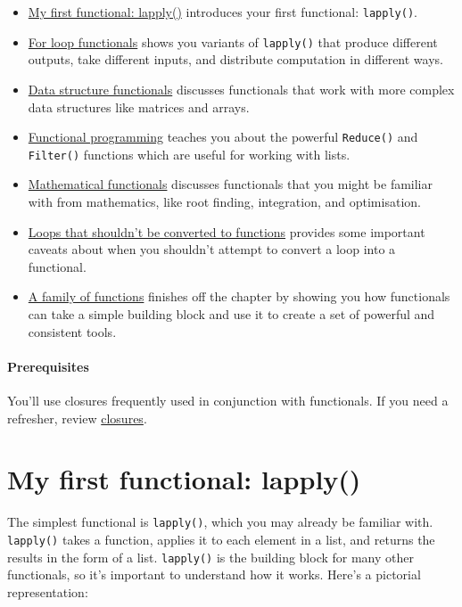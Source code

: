 \begin{itemize}
\item
  \protect\hyperlink{lapply}{My first functional: lapply()} introduces
  your first functional: \texttt{lapply()}.
\item
  \protect\hyperlink{functionals-loop}{For loop functionals} shows you
  variants of \texttt{lapply()} that produce different outputs, take
  different inputs, and distribute computation in different ways.
\item
  \protect\hyperlink{functionals-ds}{Data structure functionals}
  discusses functionals that work with more complex data structures like
  matrices and arrays.
\item
  \protect\hyperlink{functionals-fp}{Functional programming} teaches you
  about the powerful \texttt{Reduce()} and \texttt{Filter()} functions
  which are useful for working with lists.
\item
  \protect\hyperlink{functionals-math}{Mathematical functionals}
  discusses functionals that you might be familiar with from
  mathematics, like root finding, integration, and optimisation.
\item
  \protect\hyperlink{functionals-not}{Loops that shouldn't be converted
  to functions} provides some important caveats about when you shouldn't
  attempt to convert a loop into a functional.
\item
  \protect\hyperlink{function-family}{A family of functions} finishes
  off the chapter by showing you how functionals can take a simple
  building block and use it to create a set of powerful and consistent
  tools.
\end{itemize}

\hypertarget{prerequisites}{%
\paragraph{Prerequisites}\label{prerequisites}}

You'll use closures frequently used in conjunction with functionals. If
you need a refresher, review \protect\hyperlink{closures}{closures}.

\hypertarget{lapply}{%
\section{My first functional: lapply()}\label{lapply}}

The simplest functional is \texttt{lapply()}, which you may already be
familiar with. \texttt{lapply()} takes a function, applies it to each
element in a list, and returns the results in the form of a list.
\texttt{lapply()} is the building block for many other functionals, so
it's important to understand how it works. Here's a pictorial
representation: 

